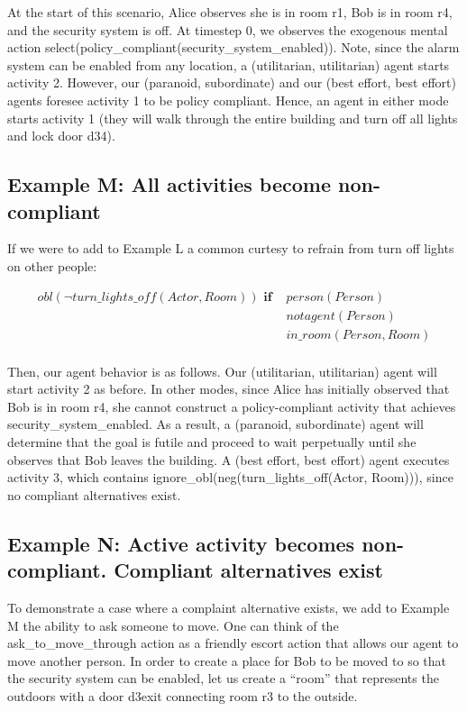 At the start of this scenario, Alice observes she is in room r1, Bob is in room r4, and the security system is off.
At timestep 0, we observes the exogenous mental action select(policy\_compliant(security\_system\_enabled)).
Note, since the alarm system can be enabled from any location, a (utilitarian, utilitarian) agent starts activity 2.
However, our (paranoid, subordinate) and our (best effort, best effort) agents foresee activity 1 to be policy compliant.
Hence, an agent in either mode starts activity 1 (they will walk through the entire building and turn off all lights and lock door d34).

\subsection{Example M: All activities become non-compliant}

If we were to add to Example L a common curtesy to refrain from turn off lights on other people:

\begin{equation}
\begin{split}
obl(\neg turn\_lights\_off(Actor, Room)) \textbf{ if }
    & person(Person) \\
    & not agent(Person) \\
    & in\_room(Person, Room) \\
\end{split}
\end{equation}

Then, our agent behavior is as follows.
Our (utilitarian, utilitarian) agent will start activity 2 as before.
In other modes, since Alice has initially observed that Bob is in room r4, she cannot construct a policy-compliant activity that achieves security\_system\_enabled.
As a result, a (paranoid, subordinate) agent will determine that the goal is futile and proceed to wait perpetually until she observes that Bob leaves the building.
A (best effort, best effort) agent executes activity 3, which contains ignore\_obl(neg(turn\_lights\_off(Actor, Room))), since no compliant alternatives exist.

\subsection{Example N: Active activity becomes non-compliant. Compliant alternatives exist}

To demonstrate a case where a complaint alternative exists, we add to Example M the ability to ask someone to move.
One can think of the ask\_to\_move\_through action as a friendly escort action that allows our agent to move another person.
In order to create a place for Bob to be moved to so that the security system can be enabled, let us create a “room” that represents the outdoors with a door d3exit connecting room r3 to the outside.

